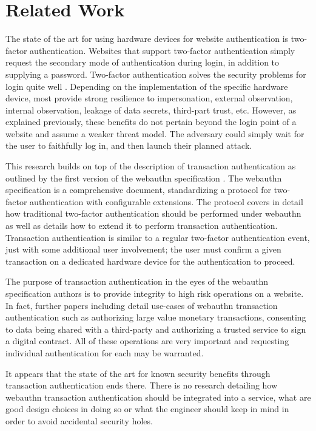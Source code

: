 \chapter{Related Work}


The state of the art for using hardware devices for website authentication is two-factor authentication. Websites that support two-factor authentication simply request the secondary mode of authentication during login, in addition to supplying a password. Two-factor authentication solves the security problems for login quite well \cite{TODO-quest-to-remove-passwords}. Depending on the implementation of the specific hardware device, most provide strong resilience to impersonation, external observation, internal observation, leakage of data secrets, third-part trust, etc. However, as explained previously, these benefits do not pertain beyond the login point of a website and assume a weaker threat model. The adversary could simply wait for the user to faithfully log in, and then launch their planned attack. 

This research builds on top of the description of transaction authentication as outlined by the first version of the webauthn specification \cite{webauthn}. The webauthn specification is a comprehensive document, standardizing a protocol for two-factor authentication with configurable extensions. The protocol covers in detail how traditional two-factor authentication should be performed under webauthn as well as details how to extend it to perform transaction authentication. Transaction authentication is similar to a regular two-factor authentication event, just with some additional user involvement; the user must confirm a given transaction on a dedicated hardware device for the authentication to proceed. 

The purpose of transaction authentication in the eyes of the webauthn specification authors is to provide integrity to high risk operations on a website. In fact, further papers including \cite{EuroFIDO} detail use-cases of webauthn transaction authentication such as authorizing large value monetary transactions, consenting to data being shared with a third-party and authorizing a trusted service to sign a digital contract. All of these operations are very important and requesting individual authentication for each may be warranted. 

It appears that the state of the art for known security benefits through transaction authentication ends there. There is no research detailing how webauthn transaction authentication should be integrated into a service, what are good design choices in doing so or what the engineer should keep in mind in order to avoid accidental security holes.

\iffalse

\fi
